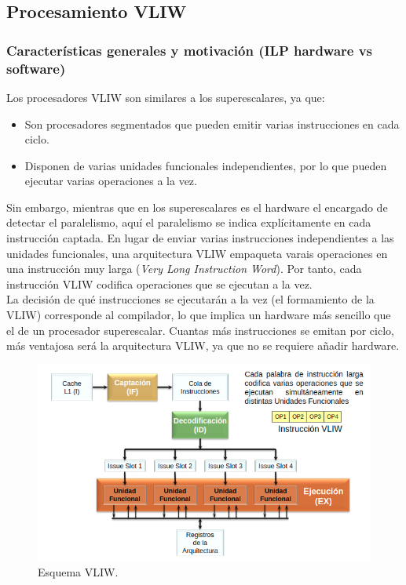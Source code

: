 \documentclass[12pt,spanish]{article}
\begin{document}
\subsection{Procesamiento VLIW}


\subsubsection{Características generales y motivación (ILP hardware vs software)}

Los procesadores VLIW son similares a los superescalares, ya que:

\begin{itemize}
	\item Son procesadores segmentados que pueden emitir varias instrucciones en cada ciclo.
	\item Disponen de varias unidades funcionales independientes, por lo que pueden ejecutar varias operaciones a la vez.
\end{itemize}

Sin embargo, mientras que en los superescalares es el hardware el encargado de detectar el paralelismo, aquí el paralelismo se indica explícitamente en cada instrucción captada. En lugar de enviar varias instrucciones independientes a las unidades funcionales, una arquitectura VLIW empaqueta varais operaciones en una instrucción muy larga (\textit{Very Long Instruction Word}). Por tanto, cada instrucción VLIW codifica operaciones que se ejecutan a la vez.\\

La decisión de qué instrucciones se ejecutarán a la vez (el formamiento de la VLIW) corresponde al compilador, lo que implica un hardware más sencillo que el de un procesador superescalar. Cuantas más instrucciones se emitan por ciclo, más ventajosa será la arquitectura VLIW, ya que no se requiere añadir hardware.\\


\begin{figure}[H]
\centering
\includegraphics[scale=0.7]{vliw.png}
\caption{Esquema VLIW.}
\end{figure}
\end{document}

